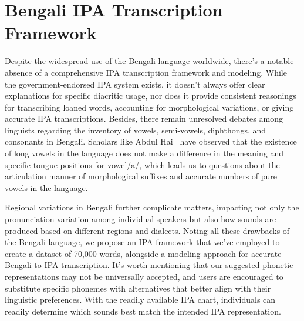 \chapter{Bengali IPA Transcription Framework}
Despite the widespread use of the Bengali language worldwide, there's a notable absence of a comprehensive IPA transcription framework and modeling. While the government-endorsed IPA system exists, it doesn't always offer clear explanations for specific diacritic usage, nor does it provide consistent reasonings for transcribing loaned words, accounting for morphological variations, or giving accurate IPA transcriptions. Besides, there remain unresolved debates among linguists regarding the inventory of vowels, semi-vowels, diphthongs, and consonants in Bengali. Scholars like Abdul Hai~\cite{hai1964dhwonibijnan} have observed that the existence of long vowels in the language does not make a difference in the meaning and specific tongue positions for vowel/a/, which leads us to questions about the articulation manner of morphological suffixes and accurate numbers of pure vowels in the language.

\vspace{5mm}

Regional variations in Bengali further complicate matters, impacting not only the pronunciation variation among individual speakers but also how sounds are produced based on different regions and dialects. Noting all these drawbacks of the Bengali language, we propose an IPA framework that we've employed to create a dataset of 70,000 words, alongside a modeling approach for accurate Bengali-to-IPA transcription. It's worth mentioning that our suggested phonetic representations may not be universally accepted, and users are encouraged to substitute specific phonemes with alternatives that better align with their linguistic preferences. With the readily available IPA chart, individuals can readily determine which sounds best match the intended IPA representation.


